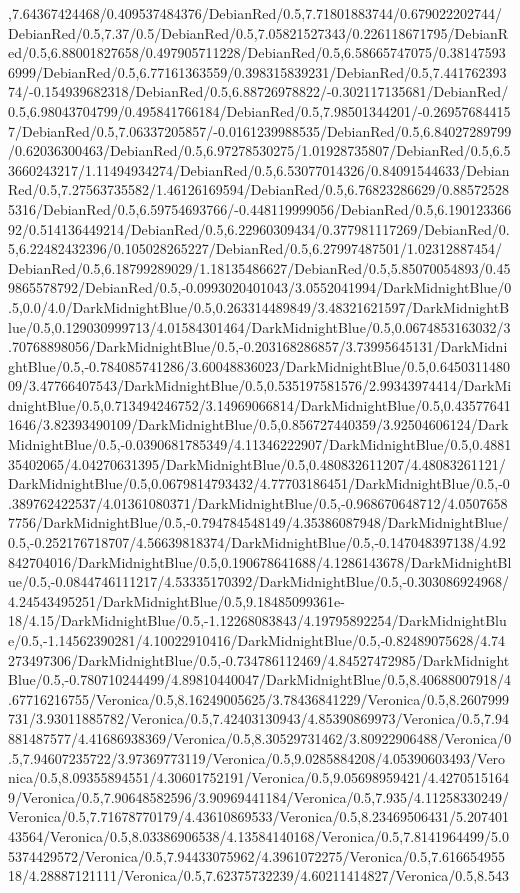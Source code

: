 {\begin{tikzternal}
,7.64367424468/0.409537484376/DebianRed/0.5,7.71801883744/0.679022202744/DebianRed/0.5,7.37/0.5/DebianRed/0.5,7.05821527343/0.226118671795/DebianRed/0.5,6.88001827658/0.497905711228/DebianRed/0.5,6.58665747075/0.381475936999/DebianRed/0.5,6.77161363559/0.398315839231/DebianRed/0.5,7.44176239374/-0.154939682318/DebianRed/0.5,6.88726978822/-0.302117135681/DebianRed/0.5,6.98043704799/0.495841766184/DebianRed/0.5,7.98501344201/-0.269576844157/DebianRed/0.5,7.06337205857/-0.0161239988535/DebianRed/0.5,6.84027289799/0.62036300463/DebianRed/0.5,6.97278530275/1.01928735807/DebianRed/0.5,6.53660243217/1.11494934274/DebianRed/0.5,6.53077014326/0.84091544633/DebianRed/0.5,7.27563735582/1.46126169594/DebianRed/0.5,6.76823286629/0.885725285316/DebianRed/0.5,6.59754693766/-0.448119999056/DebianRed/0.5,6.19012336692/0.514136449214/DebianRed/0.5,6.22960309434/0.377981117269/DebianRed/0.5,6.22482432396/0.105028265227/DebianRed/0.5,6.27997487501/1.02312887454/DebianRed/0.5,6.18799289029/1.18135486627/DebianRed/0.5,5.85070054893/0.459865578792/DebianRed/0.5,-0.0993020401043/3.0552041994/DarkMidnightBlue/0.5,0.0/4.0/DarkMidnightBlue/0.5,0.263314489849/3.48321621597/DarkMidnightBlue/0.5,0.129030999713/4.01584301464/DarkMidnightBlue/0.5,0.0674853163032/3.70768898056/DarkMidnightBlue/0.5,-0.203168286857/3.73995645131/DarkMidnightBlue/0.5,-0.784085741286/3.60048836023/DarkMidnightBlue/0.5,0.645031148009/3.47766407543/DarkMidnightBlue/0.5,0.535197581576/2.99343974414/DarkMidnightBlue/0.5,0.713494246752/3.14969066814/DarkMidnightBlue/0.5,0.435776411646/3.82393490109/DarkMidnightBlue/0.5,0.856727440359/3.92504606124/DarkMidnightBlue/0.5,-0.0390681785349/4.11346222907/DarkMidnightBlue/0.5,0.488135402065/4.04270631395/DarkMidnightBlue/0.5,0.480832611207/4.48083261121/DarkMidnightBlue/0.5,0.0679814793432/4.77703186451/DarkMidnightBlue/0.5,-0.389762422537/4.01361080371/DarkMidnightBlue/0.5,-0.968670648712/4.05076587756/DarkMidnightBlue/0.5,-0.794784548149/4.35386087948/DarkMidnightBlue/0.5,-0.252176718707/4.56639818374/DarkMidnightBlue/0.5,-0.147048397138/4.92842704016/DarkMidnightBlue/0.5,0.190678641688/4.1286143678/DarkMidnightBlue/0.5,-0.0844746111217/4.53335170392/DarkMidnightBlue/0.5,-0.303086924968/4.24543495251/DarkMidnightBlue/0.5,9.18485099361e-18/4.15/DarkMidnightBlue/0.5,-1.12268083843/4.19795892254/DarkMidnightBlue/0.5,-1.14562390281/4.10022910416/DarkMidnightBlue/0.5,-0.82489075628/4.74273497306/DarkMidnightBlue/0.5,-0.734786112469/4.84527472985/DarkMidnightBlue/0.5,-0.780710244499/4.89810440047/DarkMidnightBlue/0.5,8.40688007918/4.67716216755/Veronica/0.5,8.16249005625/3.78436841229/Veronica/0.5,8.2607999731/3.93011885782/Veronica/0.5,7.42403130943/4.85390869973/Veronica/0.5,7.94881487577/4.41686938369/Veronica/0.5,8.30529731462/3.80922906488/Veronica/0.5,7.94607235722/3.97369773119/Veronica/0.5,9.0285884208/4.05390603493/Veronica/0.5,8.09355894551/4.30601752191/Veronica/0.5,9.05698959421/4.42705151649/Veronica/0.5,7.90648582596/3.90969441184/Veronica/0.5,7.935/4.11258330249/Veronica/0.5,7.71678770179/4.43610869533/Veronica/0.5,8.23469506431/5.20740143564/Veronica/0.5,8.03386906538/4.13584140168/Veronica/0.5,7.8141964499/5.05374429572/Veronica/0.5,7.94433075962/4.3961072275/Veronica/0.5,7.61665495518/4.28887121111/Veronica/0.5,7.62375732239/4.60211414827/Veronica/0.5,8.543
\end{tikzternal}}
